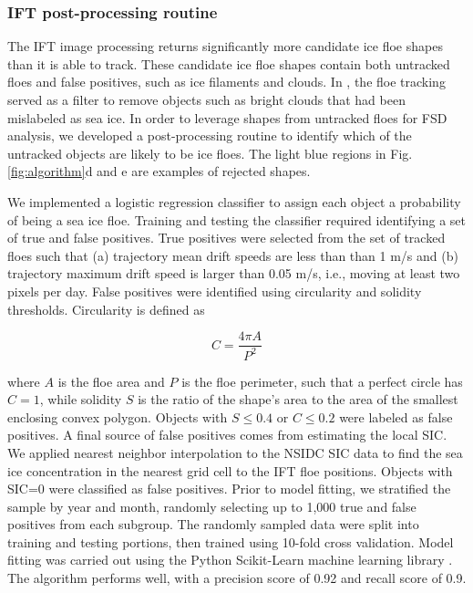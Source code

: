 \documentclass[aog]{igs}
\begin{document}
\subsubsection{IFT post-processing routine}
The IFT image processing returns significantly more candidate ice floe shapes than it is able to track. These candidate ice floe shapes contain both untracked floes and false positives, such as ice filaments and clouds. In \cite{lopez-acosta2019_IceFloe}, the floe tracking served as a filter to remove objects such as bright clouds that had been mislabeled as sea ice. In order to leverage shapes from untracked floes for FSD analysis, we developed a post-processing routine to identify which of the untracked objects are likely to be ice floes.
The light blue regions in Fig. \ref{fig:algorithm}d and e are examples of rejected shapes.

We implemented a logistic regression classifier to assign each object a probability of being a sea ice floe. Training and testing the classifier required identifying a set of true and false positives. True positives were selected from the set of tracked floes such that (a) trajectory mean drift speeds are less than than 1 m/s and (b) trajectory maximum drift speed is larger than 0.05 m/s, i.e., moving at least two pixels per day. False positives were identified using circularity and solidity  thresholds. 
Circularity is defined as 
\begin{linenomath*}
\begin{equation}
    C = \frac{4\pi A}{P^2}
\end{equation}
\end{linenomath*}
where $A$ is the floe area and $P$ is the floe perimeter, such that a perfect circle has $C=1$, while solidity $S$ is the ratio of the shape's area to the area of the smallest enclosing convex polygon. Objects with $S \leq 0.4$ or $C \leq 0.2$ were labeled as false positives. A final source of false positives comes from estimating the local SIC.
We applied nearest neighbor interpolation to the NSIDC SIC data to find the sea ice concentration in the nearest grid cell to the IFT floe positions. Objects with SIC=0 were classified as false positives.
Prior to model fitting, we stratified the sample by year and month, randomly selecting up to 1,000 true and false positives from each subgroup. The randomly sampled data were split into training and testing portions, then trained using 10-fold cross validation. Model fitting was carried out using the Python Scikit-Learn machine learning library \citep{Pedregosa2011}. The algorithm performs well, with a precision score of 0.92 and recall score of 0.9.
\end{document}
